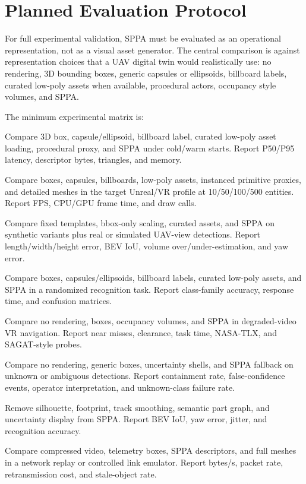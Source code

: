 ﻿\documentclass[11pt,a4paper]{article}
\begin{document}
\section{Planned Evaluation Protocol}

For full experimental validation, SPPA must be evaluated as an operational
representation, not as a visual asset generator. The central comparison is
against representation choices that a UAV digital twin would realistically use:
no rendering, 3D bounding boxes, generic capsules or ellipsoids, billboard
labels, curated low-poly assets when available, procedural actors, occupancy
style volumes, and SPPA.

The minimum experimental matrix is:
\begin{description}[leftmargin=1.3cm,style=nextline]
    \item[Runtime generation.] Compare 3D box, capsule/ellipsoid, billboard
    label, curated low-poly asset loading, procedural proxy, and SPPA under
    cold/warm starts. Report P50/P95 latency, descriptor bytes, triangles, and
    memory.
    \item[Dense scene.] Compare boxes, capsules, billboards, low-poly assets,
    instanced primitive proxies, and detailed meshes in the target Unreal/VR
    profile at 10/50/100/500 entities. Report FPS, CPU/GPU frame time, and draw
    calls.
    \item[Proportional adaptation.] Compare fixed templates, bbox-only scaling,
    curated assets, and SPPA on synthetic variants plus real or simulated
    UAV-view detections. Report length/width/height error, BEV IoU, volume
    over/under-estimation, and yaw error.
    \item[Operator recognition.] Compare boxes, capsules/ellipsoids, billboard
    labels, curated low-poly assets, and SPPA in a randomized recognition task.
    Report class-family accuracy, response time, and confusion matrices.
    \item[Operational navigation.] Compare no rendering, boxes, occupancy
    volumes, and SPPA in degraded-video VR navigation. Report near misses,
    clearance, task time, NASA-TLX, and SAGAT-style probes.
    \item[Fallback and uncertainty.] Compare no rendering, generic boxes,
    uncertainty shells, and SPPA fallback on unknown or ambiguous detections.
    Report containment rate, false-confidence events, operator interpretation,
    and unknown-class failure rate.
    \item[Ablation.] Remove silhouette, footprint, track smoothing, semantic
    part graph, and uncertainty display from SPPA. Report BEV IoU, yaw error,
    jitter, and recognition accuracy.
    \item[Bandwidth.] Compare compressed video, telemetry boxes, SPPA
    descriptors, and full meshes in a network replay or controlled link
    emulator. Report bytes/s, packet rate, retransmission cost, and stale-object
    rate.
\end{description}
\end{document}
